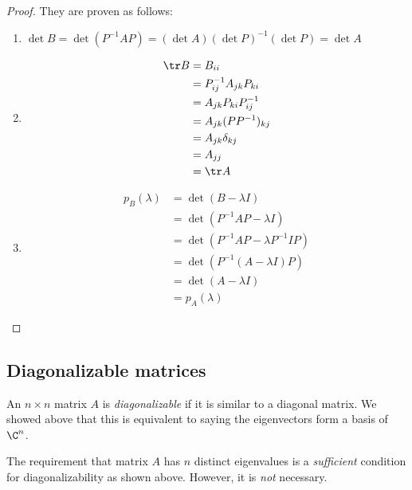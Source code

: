 \documentclass[a4paper]{article}
\begin{document}
\begin{proof}
  They are proven as follows:
  \begin{enumerate}
    \item $\det B =\det (P^{-1}AP) = (\det A) (\det P)^{-1} (\det P) = \det A$
    \item
      \begin{align*}
        \tr B &= B_{ii}\\
        &= P_{ij}^{-1} A_{jk} P_{ki}\\
        &= A_{jk} P_{ki}P_{ij}^{-1}\\
        &= A_{jk}(PP^{-1})_{kj}\\
        &= A_{jk}\delta_{kj}\\
        &= A_{jj}\\
        &= \tr A
      \end{align*}
    \item
      \begin{align*}
        p_B(\lambda) &= \det(B - \lambda I)\\
        &= \det(P^{-1}AP - \lambda I)\\
        &= \det(P^{-1}AP - \lambda P^{-1}IP)\\
        &= \det(P^{-1}(A - \lambda I)P)\\
        &= \det(A - \lambda I)\\
        &= p_A(\lambda)
      \end{align*}
  \end{enumerate}
\end{proof}
\subsection{Diagonalizable matrices}
\begin{defi}
  An $n\times n$ matrix $A$ is \emph{diagonalizable} if it is similar to a diagonal matrix. We showed above that this is equivalent to saying the eigenvectors form a basis of $\C^n$.
\end{defi}

The requirement that matrix $A$ has $n$ distinct eigenvalues is a \emph{sufficient} condition for diagonalizability as shown above. However, it is \emph{not} necessary.
\end{document}
